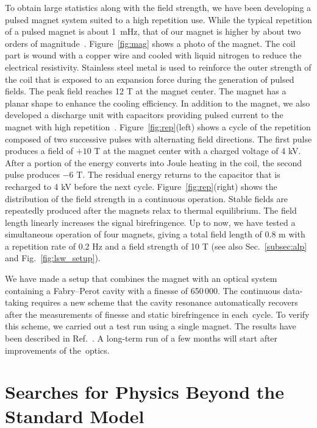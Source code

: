 \documentclass[10pt,a4paper]{article}%
\begin{document}
To obtain large statistics along with the field strength, we have been developing a pulsed magnet system suited to a high repetition use.
While the typical repetition of a pulsed magnet is about 1~mHz, that of our magnet is higher by about two orders of magnitude~\cite{pulse_mag}.
Figure~\ref{fig:mag} shows a photo of the magnet.
The coil part is wound with a copper wire and cooled with liquid nitrogen to reduce the electrical resistivity.
Stainless steel metal is used to reinforce the outer strength of the coil that is exposed to an expansion force during the generation of pulsed fields.
The peak field reaches 12 T at the magnet center.
The magnet has a planar shape to enhance the cooling efficiency.
In addition to the magnet, we also developed a discharge unit with capacitors providing pulsed current to the magnet with high repetition~\cite{pulse_mag}.
Figure~\ref{fig:rep}(left) shows a cycle of the repetition composed of two successive pulses with alternating field directions.
The first pulse produces a field of $+10$ T at the magnet center with a charged voltage of 4 kV.
After a portion of the energy converts into Joule heating in the coil, the second pulse produces $-6$ T.
The residual energy returns to the capacitor that is recharged to 4 kV before the next cycle.
Figure~\ref{fig:rep}(right) shows the distribution of the field strength in a continuous operation.
Stable fields are repeatedly produced after the magnets relax to thermal equilibrium.
The field length linearly increases the signal birefringence.
Up to now, we have tested a simultaneous operation of four magnets, giving a total field length of 0.8 m with a repetition rate of 0.2 Hz and a field strength of 10 T (see also Sec.~\ref{subsec:alp} and Fig.~\ref{fig:lsw_setup}).

We have made a setup that combines the magnet with an optical system containing a Fabry--Perot cavity with a finesse of 650\,000.
The continuous data-taking requires a new scheme that the cavity resonance automatically recovers after the measurements of finesse and static birefringence in each~cycle.
To verify this scheme, we carried out a test run using a single magnet.
The results have been described in Ref.~\cite{fan}.
A long-term run of a few months will start after improvements of the~optics.

\section{Searches for Physics Beyond the Standard Model}\label{sec:bsm}
\end{document}
